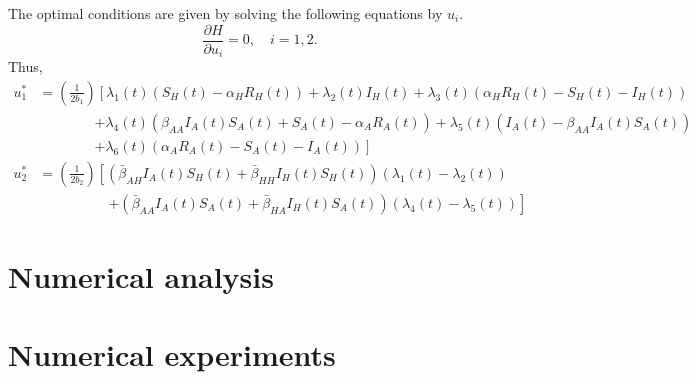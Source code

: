 \documentclass[3p,sort&compress]{elsarticle}
\DeclareRobustCommand{\1}[1]{\ensuremath \mathbbm{1}_{\{#1\}}}
\begin{document}
    The optimal conditions are given by solving the following equations by $u_{i}$. 
    \begin{equation*}
        \frac{\partial H}{\partial u_{i}} = 0,\quad i=1,2.
    \end{equation*}
    Thus,
    \begin{equation*}
        \begin{aligned}
        u_{1}^{*} &= \left(\frac{1}{2b_{1}}\right)
        \left[ 
            \lambda_{1}(t)
            \left(
            S_{H}(t) - \alpha_{H} R_{H}(t)
            \right)    
            + 
            \lambda_{2}(t) I_{H}(t)
            + 
            \lambda_{3}(t)
            \left(
            \alpha_{H} R_{H}(t) - S_{H}(t) - I_{H}(t)
            \right)
            \right.\\
            &\quad\quad\quad\quad \left.
            + 
            \lambda_{4}(t)
            \left(
                \beta_{AA} I_{A}(t) S_{A}(t) + S_{A}(t) - \alpha_{A}R_{A}(t)
            \right)
            + 
            \lambda_{5}(t)
            \left(
                I_{A}(t) - \beta_{AA} I_{A}(t) S_{A}(t)
            \right)
            \right.\\
            &\quad\quad\quad\quad \left.
            +
            \lambda_{6}(t)
            \left(
                \alpha_{A} R_{A}(t) - S_{A}(t) - I_{A}(t)
            \right)
        \right]\\[0.2cm]
        u_{2}^{*} &= \left(\frac{1}{2b_{2}}\right)
        \left[
            \left(
                \bar{\beta}_{AH} I_{A}(t) S_{H}(t)
                + 
                \bar{\beta}_{HH} I_{H}(t) S_{H}(t)
            \right)
            \left(
                \lambda_{1}(t) - \lambda_{2}(t)
            \right)
            \right.\\
            &\quad\quad\quad\quad\quad \left.
            +
            \left(
                \bar{\beta}_{AA} I_{A}(t) S_{A}(t)
                +
                \bar{\beta}_{HA} I_{H}(t) S_{A}(t)
            \right)
            \left(
                \lambda_{4}(t) - \lambda_{5}(t)
            \right)
        \right]
        \end{aligned}
    \end{equation*}
    \section{Numerical analysis}
    \section{Numerical experiments}
\end{document}

